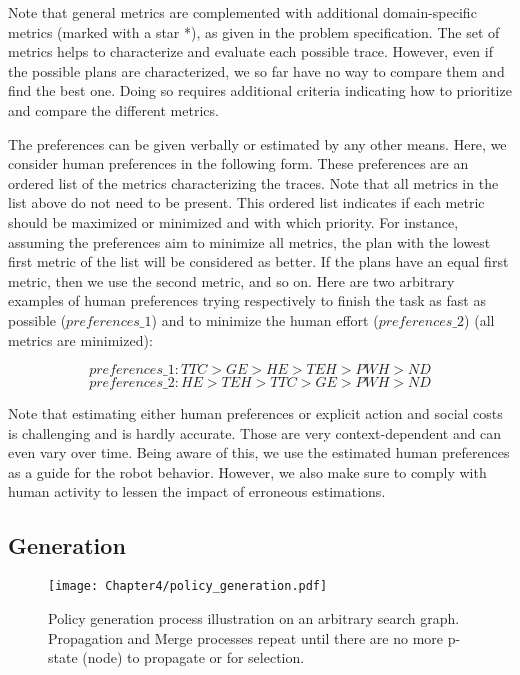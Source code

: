 Note that general metrics are complemented with additional domain-specific metrics (marked with a star *), as given in the problem specification. The set of metrics helps to characterize and evaluate each possible trace. However, even if the possible plans are characterized, we so far have no way to compare them and find the best one. Doing so requires additional criteria indicating how to prioritize and compare the different metrics.

The preferences can be given verbally or estimated by any other means. Here, we consider human preferences in the following form. These preferences are an ordered list of the metrics characterizing the traces. Note that all metrics in the list above do not need to be present. This ordered list indicates if each metric should be maximized or minimized and with which priority. For instance, assuming the preferences aim to minimize all metrics, the plan with the lowest first metric of the list will be considered as better. If the plans have an equal first metric, then we use the second metric, and so on. Here are two arbitrary examples of human preferences trying respectively to finish the task as fast as possible ($preferences\_1$) and to minimize the human effort ($preferences\_2$) (all metrics are minimized):

\begin{equation*}
    preferences\_1: TTC > GE > HE > TEH > PWH > ND 
\end{equation*}
\begin{equation*}
    preferences\_2: HE > TEH > TTC > GE > PWH > ND 
\end{equation*}


Note that estimating either human preferences or explicit action and social costs is challenging and is hardly accurate. Those are very context-dependent and can even vary over time.
Being aware of this, we use the estimated human preferences as a guide for the robot behavior. However, we also make sure to comply with human activity to lessen the impact of erroneous estimations. 

    \subsection{Generation}

\begin{figure}
    \texttt{[image: Chapter4/policy\_generation.pdf]}
    \caption{Policy generation process illustration on an arbitrary search graph. Propagation and Merge processes repeat until there are no more p-state (node) to propagate or for selection.}
    \label{fig:policy_generation}
\end{figure}

